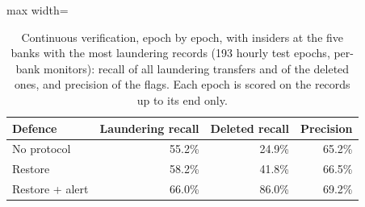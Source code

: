 \begin{table}[!htbp]\centering\small
\caption{Continuous verification, epoch by epoch, with insiders at the five banks with the most laundering records (193 hourly test epochs, per-bank monitors): recall of all laundering transfers and of the deleted ones, and precision of the flags. Each epoch is scored on the records up to its end only.}\label{tab:stream}
\begin{adjustbox}{max width=\linewidth}\begin{tabular}{lrrr}\toprule
Defence & Laundering recall & Deleted recall & Precision \\\midrule
No protocol & 55.2\% & 24.9\% & 65.2\% \\
Restore & 58.2\% & 41.8\% & 66.5\% \\
Restore + alert & 66.0\% & 86.0\% & 69.2\% \\
\bottomrule\end{tabular}\end{adjustbox}\end{table}